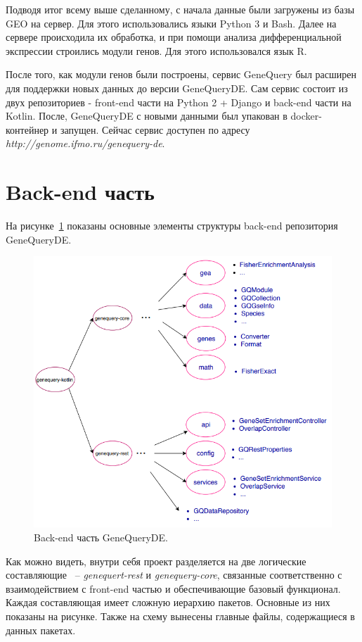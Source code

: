 \documentclass[times,specification,annotation]{itmo-student-thesis}
\begin{document}
Подводя итог всему выше сделанному, с начала данные были загружены из базы GEO на сервер. Для этого использовались языки Python 3 и Bash. Далее на сервере происходила их обработка, и при помощи анализа дифференциальной экспрессии строились модули генов. Для этого использовался язык R.

После того, как модули генов были построены, сервис GeneQuery был расширен для поддержки новых данных до версии GeneQueryDE. Сам сервис состоит из двух репозиториев - front-end части на Python 2 + Django и back-end части на Kotlin. После, GeneQueryDE с новыми данными был упакован в docker-контейнер и запущен. Сейчас сервис доступен по адресу \textit{http://genome.ifmo.ru/genequery-de}.

\section{Back-end часть}

На рисунке~\ref{genequery-kotlin} показаны основные элементы структуры back-end репозитория GeneQueryDE. 

\begin{figure}[!h]
    \caption{Back-end часть GeneQueryDE.}\label{genequery-kotlin}
    \centering
    \includegraphics[width=1\textwidth]{genequery-kotlin.png}
\end{figure}

Как можно видеть, внутри себя проект разделяется на две логические составляющие ~-- \textit{genequert-rest} и \textit{genequery-core}, связанные соответственно с взаимодействием с front-end частью и обеспечивающие базовый функционал. Каждая составляющая имеет сложную иерархию пакетов. Основные из них показаны на рисунке. Также на схему вынесены главные файлы, содержащиеся в данных пакетах.  
\end{document}
